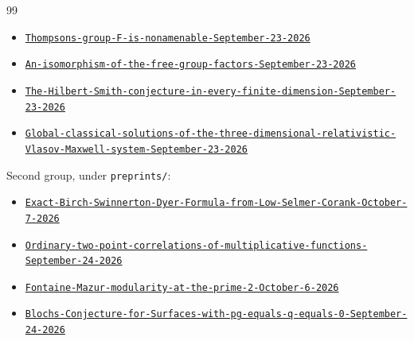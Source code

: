 \documentclass[11pt]{article}
\begin{document}
\begin{thebibliography}{99}
\begin{itemize}[nosep,leftmargin=2.2em,labelsep=0.5em]
\item[248] {\small \href{https://github.com/openai/math/tree/fd4aeeb2ee4fc729c18d98444fed42fd0529eeeb/preprints/Thompsons-group-F-is-nonamenable-September-23-2026}{\nolinkurl{Thompsons-group-F-is-nonamenable-September-23-2026}}}
\item[287] {\small \href{https://github.com/openai/math/tree/fd4aeeb2ee4fc729c18d98444fed42fd0529eeeb/preprints/An-isomorphism-of-the-free-group-factors-September-23-2026}{\nolinkurl{An-isomorphism-of-the-free-group-factors-September-23-2026}}}
\item[304] {\small \href{https://github.com/openai/math/tree/fd4aeeb2ee4fc729c18d98444fed42fd0529eeeb/preprints/The-Hilbert-Smith-conjecture-in-every-finite-dimension-September-23-2026}{\nolinkurl{The-Hilbert-Smith-conjecture-in-every-finite-dimension-September-23-2026}}}
\item[362] {\small \href{https://github.com/openai/math/tree/fd4aeeb2ee4fc729c18d98444fed42fd0529eeeb/preprints/Global-classical-solutions-of-the-three-dimensional-relativistic-Vlasov-Maxwell-system-September-23-2026}{\nolinkurl{Global-classical-solutions-of-the-three-dimensional-relativistic-Vlasov-Maxwell-system-September-23-2026}}}\end{itemize}
 Second group, under \texttt{preprints/\allowbreak{}}:\begin{itemize}[nosep,leftmargin=2.2em,labelsep=0.5em]\item[002] {\small \href{https://github.com/openai/math/tree/fd4aeeb2ee4fc729c18d98444fed42fd0529eeeb/preprints/Exact-Birch-Swinnerton-Dyer-Formula-from-Low-Selmer-Corank-October-7-2026}{\nolinkurl{Exact-Birch-Swinnerton-Dyer-Formula-from-Low-Selmer-Corank-October-7-2026}}}
\item[007] {\small \href{https://github.com/openai/math/tree/fd4aeeb2ee4fc729c18d98444fed42fd0529eeeb/preprints/Ordinary-two-point-correlations-of-multiplicative-functions-September-24-2026}{\nolinkurl{Ordinary-two-point-correlations-of-multiplicative-functions-September-24-2026}}}
\item[010] {\small \href{https://github.com/openai/math/tree/fd4aeeb2ee4fc729c18d98444fed42fd0529eeeb/preprints/Fontaine-Mazur-modularity-at-the-prime-2-October-6-2026}{\nolinkurl{Fontaine-Mazur-modularity-at-the-prime-2-October-6-2026}}}
\item[040] {\small \href{https://github.com/openai/math/tree/fd4aeeb2ee4fc729c18d98444fed42fd0529eeeb/preprints/Blochs-Conjecture-for-Surfaces-with-pg-equals-q-equals-0-September-24-2026}{\nolinkurl{Blochs-Conjecture-for-Surfaces-with-pg-equals-q-equals-0-September-24-2026}}}

\end{itemize}
\end{thebibliography}
\end{document}

